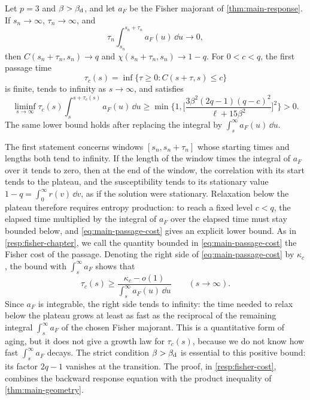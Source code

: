 \begin{theorem}\label{thm:main-fisher-cost}
Let $p=3$ and $\beta>\beta_{\mathrm d}$, and let $a_F$ be the Fisher majorant of \cref{thm:main-response}. If $s_n\to\infty$, $\tau_n\to\infty$, and
\[
 \tau_n\int_{s_n}^{s_n+\tau_n}a_F(u)\,\dd u\longrightarrow0,
\]
then $C(s_n+\tau_n,s_n)\to q$ and $\chi(s_n+\tau_n,s_n)\to1-q$. For $0<c<q$, the first passage time
\[
 \tau_c(s)=\inf\{\tau\ge0:C(s+\tau,s)\le c\}
\]
is finite, tends to infinity as $s\to\infty$, and satisfies
\begin{equation}
 \liminf_{s\to\infty}\tau_c(s)
 \int_s^{s+\tau_c(s)}a_F(u)\,\dd u
 \ge\min\biggl\{1,
 \biggl[\frac{3\beta^2(2q-1)(q-c)^2}{\ell+15\beta^2}\biggr]^2\biggr\}>0.
 \label{eq:main-passage-cost}
\end{equation}
The same lower bound holds after replacing the integral by $\int_s^\infty a_F(u)\,\dd u$.
\end{theorem}

The first statement concerns windows $[s_n,s_n+\tau_n]$ whose starting times and lengths both tend to infinity. If the length of the window times the integral of $a_F$ over it tends to zero, then at the end of the window, the correlation with its start tends to the plateau, and the susceptibility tends to its stationary value $1-q=\int_0^\infty r(v)\,\dd v$, as if the solution were stationary. Relaxation below the plateau therefore requires entropy production: to reach a fixed level $c<q$, the elapsed time multiplied by the integral of $a_F$ over the elapsed time must stay bounded below, and \eqref{eq:main-passage-cost} gives an explicit lower bound. As in \cref{resp:fisher-chapter}, we call the quantity bounded in \eqref{eq:main-passage-cost} the Fisher cost of the passage. Denoting the right side of \eqref{eq:main-passage-cost} by $\kappa_c$, the bound with $\int_s^\infty a_F$ shows that
\[
 \tau_c(s)\ge\frac{\kappa_c-o(1)}{\int_s^\infty a_F(u)\,\dd u}\qquad(s\to\infty).
\]
Since $a_F$ is integrable, the right side tends to infinity: the time needed to relax below the plateau grows at least as fast as the reciprocal of the remaining integral $\int_s^\infty a_F$ of the chosen Fisher majorant. This is a quantitative form of aging, but it does not give a growth law for $\tau_c(s)$, because we do not know how fast $\int_s^\infty a_F$ decays. The strict condition $\beta>\beta_{\mathrm d}$ is essential to this positive bound: its factor $2q-1$ vanishes at the transition. The proof, in \cref{resp:fisher-cost}, combines the backward response equation with the product inequality of \cref{thm:main-geometry}.

